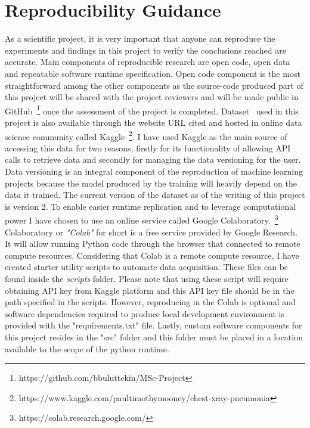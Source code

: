 \section{Reproducibility Guidance} \label{sec:reproducibility}
As a scientific project, it is very important that anyone can reproduce the experiments and findings in this project to verify the conclusions reached are accurate. Main components of reproducible research are open code, open data and repeatable software runtime specification. Open code component is the most straightforward among the other components as the source-code produced part of this project will be shared with the project reviewers and will be made public in GitHub~\footnote{https://github.com/bbuluttekin/MSc-Project} once the assessment of the project is completed. Dataset~\cite{dataset} used in this project is also available through the website URL cited and hosted in online data science community called Kaggle~\footnote{https://www.kaggle.com/paultimothymooney/chest-xray-pneumonia}. I have used Kaggle as the main source of accessing this data for two reasons, firstly for its functionality of allowing API calls to retrieve data and secondly for managing the data versioning for the user. Data versioning is an integral component of the reproduction of machine learning projects because the model produced by the training will heavily depend on the data it trained. 
The current version of the dataset as of the writing of this project is version 2. 
To enable easier runtime replication and to leverage computational power I have chosen to use an online service called Google Colaboratory.~\footnote{https://colab.research.google.com/} Colaboratory or \emph{"Colab"} for short is a free service provided by Google Research. It will allow running Python code through the browser that connected to remote compute resources. Considering that Colab is a remote compute resource, I have created starter utility scripts to automate data acquisition. These files can be found inside the \emph{scripts} folder. Please note that using these script will require obtaining API key from Kaggle platform and this API key file should be in the path specified in the scripts. However, reproducing in the Colab is optional and software dependencies required to produce local development environment is provided with the "requirements.txt" file. Lastly, custom software components for this project resides in the "src" folder and this folder must be placed in a location available to the scope of the python runtime.


\clearpage